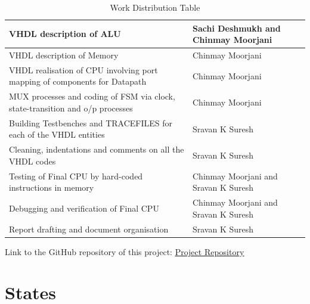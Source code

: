 \documentclass{article}
\begin{document}
\begin{table}[htb]
\begin{tabularx}{\textwidth}{|>{\centering\arraybackslash}X|>{\centering\arraybackslash}p{4cm}|}
VHDL description of ALU                                                                    & Sachi Deshmukh and Chinmay Moorjani  \\ \hline
VHDL description of Memory                                                                 & Chinmay Moorjani                     \\ \hline
VHDL realisation of CPU involving port mapping of components for Datapath            & Chinmay Moorjani                     \\ \hline
MUX processes and coding of FSM via clock, state-transition and o/p processes    & Chinmay Moorjani                     \\ \hline
Building Testbenches and TRACEFILES for each of the VHDL entities                                    & Sravan K Suresh                      \\ \hline
Cleaning, indentations and comments on all the VHDL codes                                      & Sravan K Suresh                      \\ \hline
Testing of Final CPU by hard-coded instructions in memory                                  & Chinmay Moorjani and Sravan K Suresh \\ \hline
Debugging and verification of Final CPU                                                    & Chinmay Moorjani and Sravan K Suresh       \\ \hline
Report drafting and document organisation                                                  & Sravan K Suresh                      \\ \hline
\end{tabularx}
\caption{Work Distribution Table}
\end{table}

Link to the GitHub repository of this project: \href{https://github.com/SRAVAN-IITB/EE224-Project}{\underline{Project Repository}}

\section{States}
\end{document}
